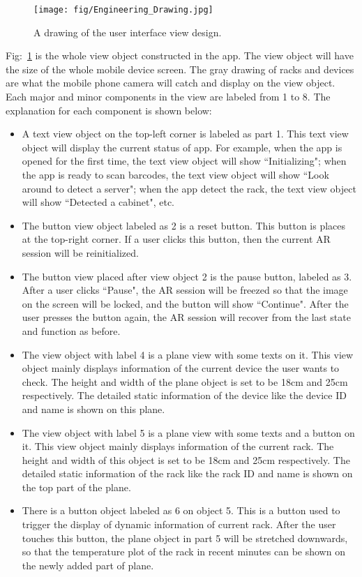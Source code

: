 \documentclass[11pt,a4paper]{article}
\begin{document}
\begin{onehalfspace}
\begin{figure}[H]
    \centering
    \texttt{[image: fig/Engineering\_Drawing.jpg]}
    \caption{A drawing of the user interface view design.}
    \label{fig:drawing}
\end{figure}
Fig:~\ref{fig:drawing} is the whole view object constructed in the app. The view object will have the size of the whole mobile device screen. The gray drawing of racks and devices are what the mobile phone camera will catch and display on the view object. Each major and minor components in the view are labeled from 1 to 8. The explanation for each component is shown below:
\begin{itemize}
    \item A text view object on the top-left corner is labeled as part 1. This text view object will display the current status of app. For example, when the app is opened for the first time, the text view object will show ``Initializing"; when the app is ready to scan barcodes, the text view object will show ``Look around to detect a server"; when the app detect the rack, the text view object will show ``Detected a cabinet", etc. 
    \item The button view object labeled as 2 is a reset button. This button is places at the top-right corner. If a user clicks this button, then the current AR session will be reinitialized. 
    \item The button view placed after view object 2 is the pause button, labeled as 3. After a user clicks ``Pause", the AR session will be freezed so that the image on the screen will be locked, and the button will show ``Continue". After the user presses the button again, the AR session will recover from the last state and function as before.
    \item The view object with label 4 is a plane view with some texts on it. This view object mainly displays information of the current device the user wants to check. The height and width of the plane object is set to be 18cm and 25cm respectively. The detailed static information of the device like the device ID and name is shown on this plane.
    \item The view object with label 5 is a plane view with some texts and a button on it. This view object mainly displays information of the current rack. The height and width of this object is set to be 18cm and 25cm respectively. The detailed static information of the rack like the rack ID and name is shown on the top part of the plane.
    \item There is a button object labeled as 6 on object 5. This is a button used to trigger the display of dynamic information of current rack. After the user touches this button, the plane object in part 5 will be stretched downwards, so that the temperature plot of the rack in recent minutes can be shown on the newly added part of plane.

\end{itemize}
\end{onehalfspace}
\end{document}
